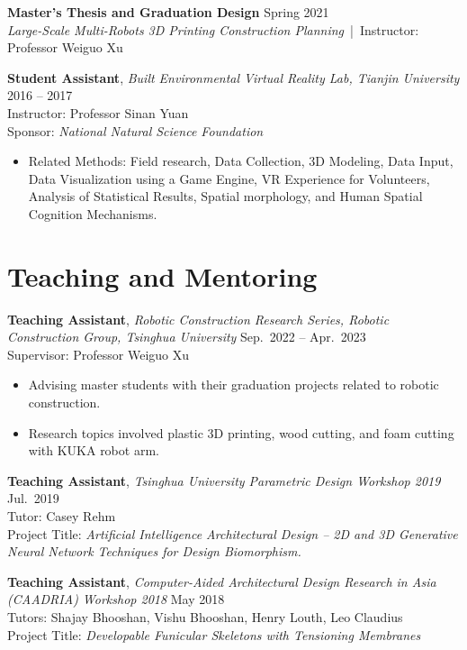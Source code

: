 \documentclass[11pt,a4paper]{article}
\newcommand{\entrytitle}[1]{\textbf{#1}}
\newcommand{\entrydetail}[1]{\textit{#1}}
\begin{document}
\entrytitle{Master's Thesis and Graduation Design} \hfill Spring 2021 \\
\entrydetail{Large-Scale Multi-Robots 3D Printing Construction Planning} \,|\, Instructor: Professor Weiguo Xu

\entrytitle{Student Assistant}, \entrydetail{Built Environmental Virtual Reality Lab, Tianjin University} \hfill 2016 -- 2017 \\
Instructor: Professor Sinan Yuan \\
Sponsor: \entrydetail{National Natural Science Foundation}
\begin{itemize}[nosep, leftmargin=1.5em]
    \item Related Methods: Field research, Data Collection, 3D Modeling, Data Input, Data Visualization using a Game Engine, VR Experience for Volunteers, Analysis of Statistical Results, Spatial morphology, and Human Spatial Cognition Mechanisms.
\end{itemize}

\section{Teaching and Mentoring}

\entrytitle{Teaching Assistant}, \entrydetail{Robotic Construction Research Series, Robotic Construction Group, Tsinghua University} \hfill Sep.\ 2022 -- Apr.\ 2023 \\
Supervisor: Professor Weiguo Xu
\begin{itemize}[nosep, leftmargin=1.5em]
    \item Advising master students with their graduation projects related to robotic construction.
    \item Research topics involved plastic 3D printing, wood cutting, and foam cutting with KUKA robot arm.
\end{itemize}

\entrytitle{Teaching Assistant}, \entrydetail{Tsinghua University Parametric Design Workshop 2019} \hfill Jul.\ 2019 \\
Tutor: Casey Rehm \\
Project Title: \entrydetail{Artificial Intelligence Architectural Design -- 2D and 3D Generative Neural Network Techniques for Design Biomorphism.}

\entrytitle{Teaching Assistant}, \entrydetail{Computer-Aided Architectural Design Research in Asia (CAADRIA) Workshop 2018} \hfill May 2018 \\
Tutors: Shajay Bhooshan, Vishu Bhooshan, Henry Louth, Leo Claudius \\
Project Title: \entrydetail{Developable Funicular Skeletons with Tensioning Membranes}
\end{document}
